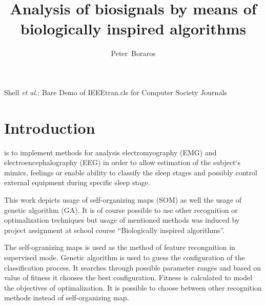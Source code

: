 \documentclass[a4paper]{IEEEtran}
\begin{document}
\title{Analysis of biosignals by means of\\ biologically inspired algorithms}

\author{Peter~Boraros%
}



%
{Shell \MakeLowercase{\textit{et al.}}: Bare Demo of IEEEtran.cls for Computer Society Journals}


\maketitle
\IEEEdisplaynotcompsoctitleabstractindextext
\IEEEpeerreviewmaketitle


\section{Introduction}
 is to implement methods for analysis 
electromyography (EMG) and electroencephalography (EEG) 
 in order to allow estimation of the subject`s mimics, 
feelings or enable ability to classify the sleep stages and possibly control 
external equipment during specific sleep stage.

This work depicts usage of self-organizing maps (SOM) as well the usage of genetic
algorithm (GA). It is of course possible to use other recognition or optimalization
techniques but usage of mentioned 
methods was induced by project assignment at school course ``Biologically inspired 
algorithms''.

The self-ogranizing maps is used as the method of feature recongnition in 
supervised mode. Genetic algorithm is used to guess the configuration of 
the classification process. It searches through possible parameter ranges and 
based on value of fitness it chooses the best configuration. Fitness is
calculated to model the objectives of optimalization. It is possible
to choose between other recognition methods instead of self-organizing map.
\end{document}
